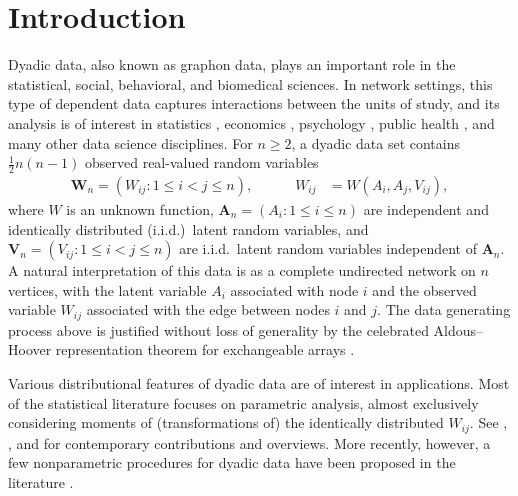 \documentclass[11pt,lof]{puthesis}
\newcommand{\bW}{\ensuremath{\mathbf{W}}}
\newcommand{\bA}{\ensuremath{\mathbf{A}}}
\newcommand{\bV}{\ensuremath{\mathbf{V}}}
\theoremstyle{break}
\theoremstyle{proof}
\begin{document}
\section{Introduction}
\label{sec:kernel_introduction}

Dyadic data, also known as graphon data, plays an important role in the
statistical, social, behavioral, and biomedical sciences. In network settings,
this type of dependent data captures interactions between the units of study,
and its analysis is of interest in statistics \citep{kolaczyk2009statistical},
economics \citep{graham2020network}, psychology \citep{kenny2020dyadic}, public
health \citep{luke2007network}, and many other data science disciplines. For
$n \geq 2$, a dyadic data set contains $\frac{1}{2}n(n-1)$ observed real-valued
random variables
%
\begin{align*}
\bW_n = (W_{i j}:1\leq i<j \leq n),
\quad\qquad W_{i j}
&= W(A_i,A_j,V_{i j}),
\end{align*}
%
where $W$ is an unknown function, $\bA_n=(A_{i}:1\leq i \leq n)$ are
independent and identically distributed (i.i.d.)\ latent random variables, and
$\bV_n=(V_{i j}:1\leq i<j \leq n)$ are i.i.d.\ latent random variables
independent of $\bA_n$. A natural interpretation of this data is as a complete
undirected network on $n$ vertices, with the latent variable $A_i$ associated
with node $i$ and the observed variable $W_{i j}$ associated with the edge
between nodes $i$ and $j$. The data generating process above is justified
without loss of generality by the celebrated Aldous--Hoover representation
theorem for exchangeable arrays
\citep{aldous1981representations,hoover1979relations}.

Various distributional features of dyadic data are of interest in applications.
Most of the statistical literature focuses on parametric analysis, almost
exclusively considering moments of (transformations of) the identically
distributed $W_{i j}$. See \citet{davezies2021exchangeable},
\citet{gao2021minimax}, and \citet{matsushita2021jackknife} for
contemporary contributions and overviews. More recently, however, a few
nonparametric procedures for dyadic data have been proposed in the literature
\citep{graham2021minimax,graham2024kernel}.
\end{document}
